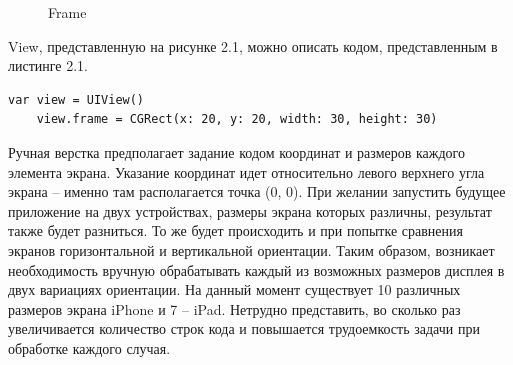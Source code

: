 \begin{figure}[h!]
	\caption{Frame}
	\label{fig:frame}
\end{figure}

View, представленную на рисунке 2.1, можно описать кодом, представленным в листинге 2.1. 

\begin{lstlisting}[caption=Задание свойства frame для UIView]
	var view = UIView()
	view.frame = CGRect(x: 20, y: 20, width: 30, height: 30)
\end{lstlisting}

Ручная верстка предполагает задание кодом координат и размеров каждого элемента экрана. Указание координат идет относительно левого верхнего угла экрана -- именно там располагается точка (0, 0). При желании запустить будущее приложение на двух устройствах, размеры экрана которых различны, результат также будет разниться. То же будет происходить и при попытке сравнения экранов горизонтальной и вертикальной ориентации. Таким образом, возникает необходимость вручную обрабатывать каждый из возможных размеров дисплея в двух вариациях ориентации. На данный момент существует 10 различных размеров экрана iPhone и 7 -- iPad. Нетрудно представить, во сколько раз увеличивается количество строк кода и повышается трудоемкость задачи при обработке каждого случая. 

